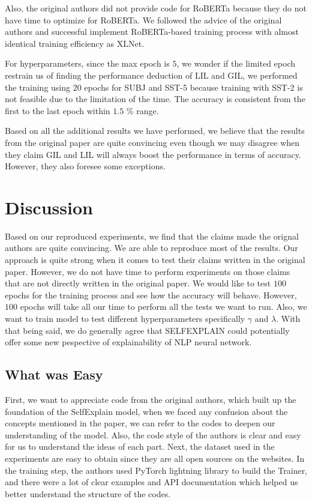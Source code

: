 \documentclass{article}
\begin{document}
Also, the original authors did not provide code for RoBERTa because they do not have time to optimize for RoBERTa.
We followed the advice of the original authors and successful implement RoBERTa-based training process with almost 
identical training efficiency as XLNet.

For hyperparameters, since the max epoch is $5$, we wonder if the limited epoch restrain us of finding the performance
deduction of LIL and GIL, we performed the training using $20$ epochs for SUBJ and SST-5 because training with 
SST-2 is not feasible due to the limitation of the time. The accuracy is consistent from the first to the last 
epoch within $1.5$ \% range.

Based on all the additional results we have performed, we believe that the results from the original paper are quite 
convincing even though we may disagree when they claim GIL and LIL will always boost the performance in terms of accuracy.
However, they also foresee some exceptions.

\section{Discussion}

Based on our reproduced experiments, we find that the claims made the orignal authors are quite convincing. We are able 
to reproduce most of the results. Our approach is quite strong when it comes to test their claims written in the 
original paper. However, we do not have time to perform experiments on those claims that are not directly 
written in the original paper. We would like to test $100$ epochs for the training process and see how 
the accuracy will behave. However, $100$ epochs will take all our time to perform all the tests we want to 
run. Also, we want to train model to test different hyperparameters specifically $\gamma$ and $\lambda$. With that 
being said, we do generally agree that SELFEXPLAIN could potentially offer some new pespective of explainability of 
NLP neural network.

\subsection{What was Easy}

First, we want to appreciate code from the original authors, which built up the foundation of the SelfExplain model, when we faced any confusion about the concepts mentioned in the paper, we can refer to the codes to deepen our understanding of the model. Also, the code style of the authors is clear and easy for us to understand the ideas of each part. Next, the dataset used in the experiments are easy to obtain since they are all open sources on the websites. In the training step, the authors used PyTorch lightning library to build the Trainer, and there were a lot of clear examples and API documentation which helped us better understand the structure of the codes.  
\end{document}
